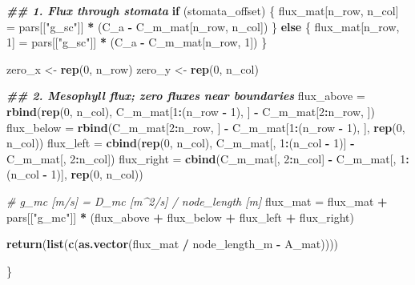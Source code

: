 \documentclass[12pt,halfline,a4paper,]{ouparticle}
\newenvironment{Shaded}{\begin{snugshade}}{\end{snugshade}}
\newcommand{\CommentTok}[1]{\textcolor[rgb]{0.56,0.35,0.01}{\textit{#1}}}
\newcommand{\ControlFlowTok}[1]{\textcolor[rgb]{0.13,0.29,0.53}{\textbf{#1}}}
\newcommand{\DecValTok}[1]{\textcolor[rgb]{0.00,0.00,0.81}{#1}}
\newcommand{\DocumentationTok}[1]{\textcolor[rgb]{0.56,0.35,0.01}{\textbf{\textit{#1}}}}
\newcommand{\FunctionTok}[1]{\textcolor[rgb]{0.13,0.29,0.53}{\textbf{#1}}}
\newcommand{\NormalTok}[1]{#1}
\newcommand{\OtherTok}[1]{\textcolor[rgb]{0.56,0.35,0.01}{#1}}
\newcommand{\SpecialCharTok}[1]{\textcolor[rgb]{0.81,0.36,0.00}{\textbf{#1}}}
\newcommand{\StringTok}[1]{\textcolor[rgb]{0.31,0.60,0.02}{#1}}
\begin{document}
\begin{Shaded}
\begin{Highlighting}[]
  \DocumentationTok{\#\# 1. Flux through stomata}
  \ControlFlowTok{if}\NormalTok{ (stomata\_offset) \{}
\NormalTok{    flux\_mat[n\_row, n\_col] }\OtherTok{=}\NormalTok{ pars[[}\StringTok{"g\_sc"}\NormalTok{]] }\SpecialCharTok{*}\NormalTok{ (C\_a }\SpecialCharTok{{-}}\NormalTok{ C\_m\_mat[n\_row, n\_col])}
\NormalTok{  \} }\ControlFlowTok{else}\NormalTok{ \{}
\NormalTok{    flux\_mat[n\_row, }\DecValTok{1}\NormalTok{] }\OtherTok{=}\NormalTok{ pars[[}\StringTok{"g\_sc"}\NormalTok{]] }\SpecialCharTok{*}\NormalTok{ (C\_a }\SpecialCharTok{{-}}\NormalTok{ C\_m\_mat[n\_row, }\DecValTok{1}\NormalTok{])}
\NormalTok{  \}}

\NormalTok{  zero\_x }\OtherTok{\textless{}{-}} \FunctionTok{rep}\NormalTok{(}\DecValTok{0}\NormalTok{, n\_row)}
\NormalTok{  zero\_y }\OtherTok{\textless{}{-}} \FunctionTok{rep}\NormalTok{(}\DecValTok{0}\NormalTok{, n\_col)}

  \DocumentationTok{\#\# 2. Mesophyll flux; zero fluxes near boundaries}
\NormalTok{  flux\_above }\OtherTok{=} \FunctionTok{rbind}\NormalTok{(}\FunctionTok{rep}\NormalTok{(}\DecValTok{0}\NormalTok{, n\_col), C\_m\_mat[}\DecValTok{1}\SpecialCharTok{:}\NormalTok{(n\_row }\SpecialCharTok{{-}} \DecValTok{1}\NormalTok{), ] }\SpecialCharTok{{-}}\NormalTok{ C\_m\_mat[}\DecValTok{2}\SpecialCharTok{:}\NormalTok{n\_row, ])}
\NormalTok{  flux\_below }\OtherTok{=} \FunctionTok{rbind}\NormalTok{(C\_m\_mat[}\DecValTok{2}\SpecialCharTok{:}\NormalTok{n\_row, ] }\SpecialCharTok{{-}}\NormalTok{ C\_m\_mat[}\DecValTok{1}\SpecialCharTok{:}\NormalTok{(n\_row }\SpecialCharTok{{-}} \DecValTok{1}\NormalTok{), ], }\FunctionTok{rep}\NormalTok{(}\DecValTok{0}\NormalTok{, n\_col))}
\NormalTok{  flux\_left  }\OtherTok{=} \FunctionTok{cbind}\NormalTok{(}\FunctionTok{rep}\NormalTok{(}\DecValTok{0}\NormalTok{, n\_col), C\_m\_mat[, }\DecValTok{1}\SpecialCharTok{:}\NormalTok{(n\_col }\SpecialCharTok{{-}} \DecValTok{1}\NormalTok{)] }\SpecialCharTok{{-}}\NormalTok{ C\_m\_mat[, }\DecValTok{2}\SpecialCharTok{:}\NormalTok{n\_col])}
\NormalTok{  flux\_right }\OtherTok{=} \FunctionTok{cbind}\NormalTok{(C\_m\_mat[, }\DecValTok{2}\SpecialCharTok{:}\NormalTok{n\_col] }\SpecialCharTok{{-}}\NormalTok{ C\_m\_mat[, }\DecValTok{1}\SpecialCharTok{:}\NormalTok{(n\_col }\SpecialCharTok{{-}} \DecValTok{1}\NormalTok{)], }\FunctionTok{rep}\NormalTok{(}\DecValTok{0}\NormalTok{, n\_col))}

  \CommentTok{\# g\_mc [m/s] = D\_mc [m\^{}2/s] / node\_length [m]}
\NormalTok{  flux\_mat }\OtherTok{=}\NormalTok{ flux\_mat }\SpecialCharTok{+}\NormalTok{ pars[[}\StringTok{"g\_mc"}\NormalTok{]] }\SpecialCharTok{*}\NormalTok{ (flux\_above }\SpecialCharTok{+}\NormalTok{ flux\_below }\SpecialCharTok{+}\NormalTok{ flux\_left }\SpecialCharTok{+}\NormalTok{ flux\_right)}

    \FunctionTok{return}\NormalTok{(}\FunctionTok{list}\NormalTok{(}\FunctionTok{c}\NormalTok{(}\FunctionTok{as.vector}\NormalTok{(flux\_mat }\SpecialCharTok{/}\NormalTok{ node\_length\_m }\SpecialCharTok{{-}}\NormalTok{ A\_mat))))}

\NormalTok{\}}
\end{Highlighting}
\end{Shaded}
\end{document}
